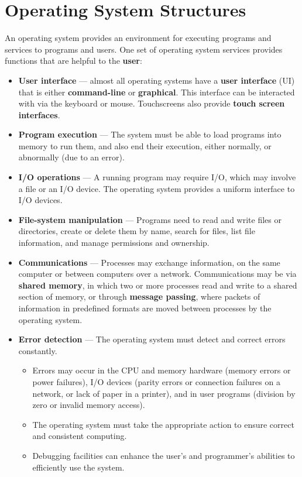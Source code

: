 \documentclass{article}
\begin{document}
\section{Operating System Structures}
An operating system provides an environment for executing programs and
services to programs and users. One set of operating system services
provides functions that are helpful to the \textbf{user}:
\begin{itemize}
    \item \textbf{User
              interface} --- almost all operating systems have a \textbf{user
              interface} (UI) that is either \textbf{command-line} or
          \textbf{graphical}.
          This interface can be interacted with via the keyboard or
          mouse.
          Touchscreens also provide \textbf{touch screen interfaces}.
    \item \textbf{Program execution} --- The system must be able to load
          programs into memory to run them, and also end their execution,
          either normally, or abnormally (due to an error).
    \item \textbf{I/O operations} --- A running program may require I/O,
          which may involve a file or an I/O device.
          The operating system provides a uniform interface to I/O
          devices.
    \item \textbf{File-system manipulation} --- Programs need to read
          and write files or directories, create or delete them by
          name, search for files, list file information, and manage
          permissions and ownership.
    \item \textbf{Communications} --- Processes may exchange
          information, on the same computer or between computers over a
          network.
          Communications may be via \textbf{shared memory}, in which
          two or more processes read and write to a shared section of
          memory, or through \textbf{message passing}, where packets of
          information in predefined formats are moved between processes
          by the operating system.
    \item \textbf{Error detection} --- The operating system must detect
          and correct errors constantly.
          \begin{itemize}
              \item Errors may occur in the CPU and memory hardware
                    (memory errors or power failures), I/O devices
                    (parity errors or connection failures on a network,
                    or lack of paper in a printer), and in user
                    programs (division by zero or invalid memory
                    access).
              \item The operating system must take the appropriate
                    action to ensure correct and consistent computing.
              \item Debugging facilities can enhance the user's and
                    programmer's abilities to efficiently use the
                    system.
          \end{itemize}
\end{itemize}
\end{document}
